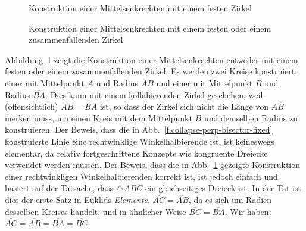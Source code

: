 \begin{figure}[t]
\begin{minipage}{.45\textwidth}
\caption{Konstruktion einer Mittelsenkrechten mit einem festen Zirkel}\label{f.collapse-perp-bisector-fixed}
\end{minipage}
\hfill
\begin{minipage}{.45\textwidth}
\caption{Konstruktion einer Mittelsenkrechten mit einem festen oder einem zusammenfallenden Zirkel}\label{f.collapse-perp-bisector-collapse}
\end{minipage}
\end{figure}

Abbildung~\ref{f.collapse-perp-bisector-collapse} zeigt die Konstruktion einer Mittelsenkrechten entweder mit einem festen oder einem zusammenfallenden Zirkel. Es werden zwei Kreise konstruiert: einer mit Mittelpunkt $A$ und Radius $\overline{AB}$ und einer mit Mittelpunkt $B$ und Radius $\overline {BA}$. Dies kann mit einem kollabierenden Zirkel geschehen, weil (offensichtlich) $\overline{AB}=\overline{BA}$ ist, so dass der Zirkel sich nicht die Länge von $\overline{AB}$ merken muss, um einen Kreis mit dem Mittelpunkt $B$ und demselben Radius zu konstruieren.
Der Beweis, dass die in Abb.~\ref{f.collapse-perp-bisector-fixed} konstruierte Linie eine rechtwinklige Winkelhalbierende ist, ist keineswegs elementar, da relativ fortgeschrittene Konzepte wie kongruente Dreiecke verwendet werden müssen. Der Beweis, dass die in Abb.~\ref{f.collapse-perp-bisector-collapse} gezeigte Konstruktion einer rechtwinkligen Winkelhalbierenden korrekt ist, ist jedoch einfach und basiert auf der Tatsache, dass $\triangle ABC$ ein gleichseitiges Dreieck ist. In der Tat ist dies der erste Satz in Euklids \textit{Elemente}.
$\overline{AC}=\overline{AB}$, da es sich um Radien desselben Kreises handelt, und in ähnlicher Weise $\overline{BC}=\overline{BA}$. Wir haben: $
\overline{AC}=\overline{AB}=\overline{BA}=\overline{BC}$.

